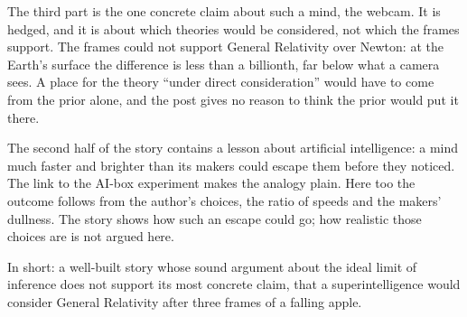 \begin{afterword}
The third part is the one concrete claim about such a mind, the webcam. It is hedged, and it is about which theories would be considered, not which the frames support. The frames could not support General Relativity over Newton: at the Earth's surface the difference is less than a billionth, far below what a camera sees. A place for the theory ``under direct consideration'' would have to come from the prior alone, and the post gives no reason to think the prior would put it there.

The second half of the story contains a lesson about artificial intelligence: a mind much faster and brighter than its makers could escape them before they noticed. The link to the AI-box experiment makes the analogy plain. Here too the outcome follows from the author's choices, the ratio of speeds and the makers' dullness. The story shows how such an escape could go; how realistic those choices are is not argued here.

In short: a well-built story whose sound argument about the ideal limit of inference does not support its most concrete claim, that a superintelligence would consider General Relativity after three frames of a falling apple.
\end{afterword}
